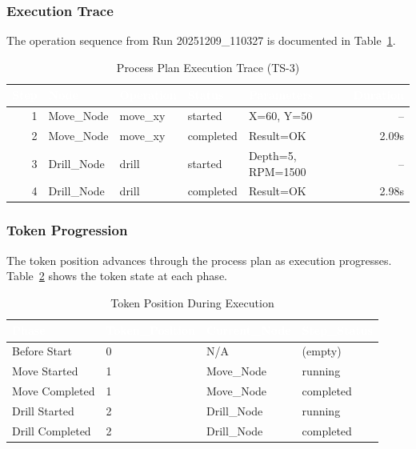 \subsubsection{Execution Trace}

The operation sequence from Run 20251209\_110327 is documented in Table~\ref{tab:execution_trace}.

\begin{table}[ht]
\centering
\caption{Process Plan Execution Trace (TS-3)}
\label{tab:execution_trace}
\begin{tabular}{rllllr}
\toprule
\rowcolor{headerblue}
\textcolor{white}{Step} & \textcolor{white}{Node} & \textcolor{white}{Operation} & \textcolor{white}{Status} & \textcolor{white}{Parameters} & \textcolor{white}{Duration} \\
\midrule
1 & Move\_Node & move\_xy & started & X=60, Y=50 & -- \\
2 & Move\_Node & move\_xy & completed & Result=OK & 2.09s \\
\rowcolor{lightgray}
3 & Drill\_Node & drill & started & Depth=5, RPM=1500 & -- \\
4 & Drill\_Node & drill & completed & Result=OK & 2.98s \\
\bottomrule
\end{tabular}
\end{table}

\subsubsection{Token Progression}

The token position advances through the process plan as execution progresses. Table~\ref{tab:token_progression} shows the token state at each phase.

\begin{table}[ht]
\centering
\caption{Token Position During Execution}
\label{tab:token_progression}
\begin{tabular}{llll}
\toprule
\rowcolor{headerblue}
\textcolor{white}{Phase} & \textcolor{white}{Token\_Position} & \textcolor{white}{Current\_Node} & \textcolor{white}{Step\_Status} \\
\midrule
Before Start & 0 & N/A & (empty) \\
\rowcolor{lightgray}
Move Started & 1 & Move\_Node & running \\
Move Completed & 1 & Move\_Node & completed \\
\rowcolor{lightgray}
Drill Started & 2 & Drill\_Node & running \\
Drill Completed & 2 & Drill\_Node & completed \\
\bottomrule
\end{tabular}
\end{table}

